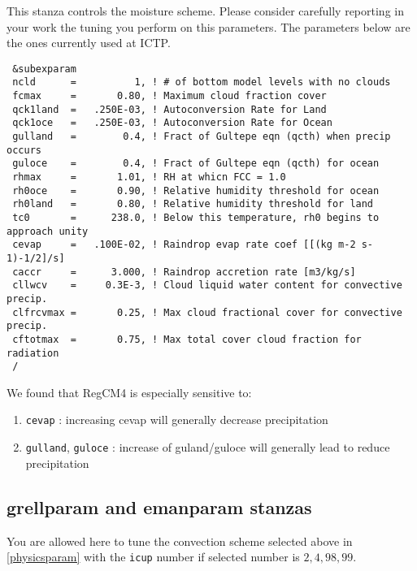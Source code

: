 This stanza controls the moisture scheme. Please consider carefully reporting
in your work the tuning you perform on this parameters. The parameters below
are the ones currently used at ICTP.

{\footnotesize
\begin{Verbatim}
 &subexparam
 ncld      =          1, ! # of bottom model levels with no clouds
 fcmax     =       0.80, ! Maximum cloud fraction cover
 qck1land  =   .250E-03, ! Autoconversion Rate for Land
 qck1oce   =   .250E-03, ! Autoconversion Rate for Ocean
 gulland   =        0.4, ! Fract of Gultepe eqn (qcth) when precip occurs
 guloce    =        0.4, ! Fract of Gultepe eqn (qcth) for ocean
 rhmax     =       1.01, ! RH at whicn FCC = 1.0
 rh0oce    =       0.90, ! Relative humidity threshold for ocean
 rh0land   =       0.80, ! Relative humidity threshold for land
 tc0       =      238.0, ! Below this temperature, rh0 begins to approach unity
 cevap     =   .100E-02, ! Raindrop evap rate coef [[(kg m-2 s-1)-1/2]/s]
 caccr     =      3.000, ! Raindrop accretion rate [m3/kg/s]
 cllwcv    =     0.3E-3, ! Cloud liquid water content for convective precip.
 clfrcvmax =       0.25, ! Max cloud fractional cover for convective precip.
 cftotmax  =       0.75, ! Max total cover cloud fraction for radiation
 /
\end{Verbatim}
}

We found that RegCM4 is especially sensitive to:

\begin{enumerate}
\item \verb=cevap= : increasing cevap will generally decrease precipitation
\item \verb=gulland=, \verb=guloce= : increase of guland/guloce will generally
lead to reduce precipitation
\end{enumerate}

\subsection{grellparam and emanparam stanzas}

You are allowed here to tune the convection scheme selected above in
\ref{physicsparam} with the \verb=icup= number if selected number is
$2, 4, 98, 99$. 

